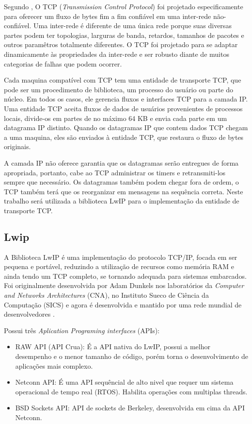 Segundo , O TCP (\textit{Transmission Control Protocol}) foi projetado especificamente para oferecer um fluxo de bytes fim a fim confiável em uma inter-rede não-confiável. Uma inter-rede é diferente de uma única rede porque suas diversas partes podem ter topologias, larguras de banda, retardos, tamanhos de pacotes e outros paramêtros totalmente diferentes. O TCP foi projetado para se adaptar dinamicamente às propriedades da inter-rede e ser robusto diante de muitos categorias de falhas que podem ocorrer.

Cada maquina compatível com TCP tem uma entidade de transporte TCP, que pode ser um procedimento de biblioteca, um processo do usuário ou parte do núcleo. Em todos os casos, ele gerencia fluxos e interfaces TCP para a camada IP. Uma entidade TCP aceita fluxos de dados de usuários provenientes de processos locais, divide-os em partes de no máximo 64 KB e envia cada parte em um datagrama IP distinto. Quando os datagramas IP que contem dados TCP chegam a uma maquina, eles são enviados à entidade TCP, que restaura o fluxo de bytes originais.

A camada IP não oferece garantia que os datagramas serão entregues de forma apropriada, portanto, cabe ao TCP administrar os timers e retransmiti-los sempre que necessário. Os datagramas também podem chegar fora de ordem, o TCP também terá que os reorganizar em mensagens na sequência correta. Neste trabalho será utilizada a biblioteca LwIP para o implementação da entidade de transporte TCP.

\subsection{Lwip}
A Biblioteca LwIP é uma implementação do protocolo TCP/IP, focada em ser pequena e portável, reduzindo a utilização de recursos como memória RAM e ainda tendo um TCP completo, se tornando adequada para sistemas embarcados. Foi originalmente desenvolvida por Adam Dunkels nos laboratórios da \textit{Computer and Networks Architectures} (CNA), no Instituto Sueco de Ciência da Computação (SICS) e agora é desenvolvida e mantido por uma rede mundial de desenvolvedores \cite{LWIP}.

Possui três \textit{Aplication Programing interfaces} (APIs):
\begin{itemize}
\item RAW API (API Crua): É a API nativa do LwIP, possui a melhor desempenho e o menor tamanho de código, porém torna o desenvolvimento de aplicações mais complexo.
\item Netconn API: É uma API sequêncial de alto nivel que requer um sistema operacional de tempo real (RTOS). Habilita operações com multiplas threads.
\item BSD Sockets API: API de sockets de Berkeley, desenvolvida em cima da API Netconn.
\end{itemize}





